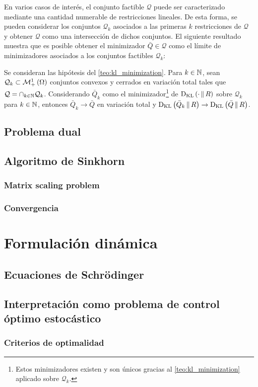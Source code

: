 En varios casos de interés, el conjunto factible $\mathcal{Q}$ puede ser caracterizado mediante una cantidad numerable de restricciones lineales. De esta forma, se pueden considerar los conjuntos $\mathcal{Q}_k$ asociados a las primeras $k$ restricciones de $\mathcal{Q}$ y obtener $\mathcal{Q}$ como una intersección de dichos conjuntos. El siguiente resultado muestra que es posible obtener el minimizador $\bar Q\in\mathcal{Q}$ como el límite de minimizadores asociados a los conjuntos factibles $\mathcal{Q}_k$:

\begin{prop}
	Se consideran las hipótesis del \autoref{teo:kl_minimization}. Para $k\in\mathbb{N}$, sean $\mathcal{Q}_k\subset\mathcal{M}_+^1\left(\Omega\right)$ conjuntos convexos y cerrados en variación total tales que $\mathcal{Q}=\cap_{k\in\mathbb{N}} \mathcal{Q}_k$. Considerando $\bar{Q}_k$ como el minimizador\footnote{Estos minimizadores existen y son únicos gracias al \autoref{teo:kl_minimization} aplicado sobre $\mathcal{Q}_k$.} de $\operatorname{D_{KL}}\left(\cdot\,\|\,R\right)$ sobre $\mathcal{Q}_k$ para $k\in\mathbb{N}$, entonces $\bar Q_k \to \bar Q$ en variación total y $\operatorname{D_{KL}}\left(\bar Q_k\,\|\,R\right)\to\operatorname{D_{KL}}\left(\bar Q\,\|\,R\right)$.
\end{prop}

\subsection{Problema dual}
\label{eot_sbp/static_sbp/dual}

\subsection{Algoritmo de Sinkhorn}
\label{eot_sbp/static_sbp/sinkhorn}

\subsubsection{Matrix scaling problem}

\subsubsection{Convergencia}

\section{Formulación dinámica}
\label{eot_sbp/dynamic}

\subsection{Ecuaciones de Schrödinger}
\label{eot_sbp/dynamic/schrodinger_equations}

\subsection{Interpretación como problema de control óptimo estocástico}
\label{eot_sbp/dynamic/optimal_control}

\subsubsection{Criterios de optimalidad}